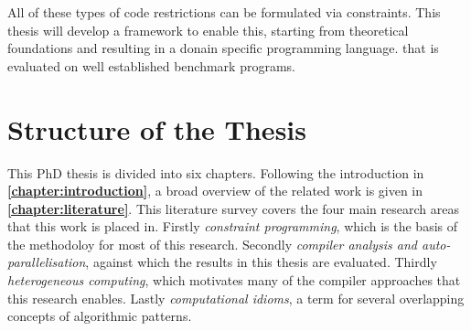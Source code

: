     All of these types of code restrictions can be formulated via constraints.
    This thesis will develop a framework to enable this, starting from
    theoretical foundations and resulting in a donain specific programming
    language. that is evaluated on well established benchmark programs.








\pagebreak
\section{Structure of the Thesis}

    This PhD thesis is divided into six chapters.
    Following the introduction in {\bf\cref{chapter:introduction}}, a broad
    overview of the related work is given in {\bf\cref{chapter:literature}}.
    This literature survey covers the four main research areas that this work
    is placed in.
    Firstly {\em constraint programming}, which is the basis of the methodoloy
    for most of this research.
    Secondly {\em compiler analysis and auto-parallelisation}, against which the
    results in this thesis are evaluated.
    Thirdly {\em heterogeneous computing}, which motivates many of the compiler
    approaches that this research enables.
    Lastly {\em computational idioms}, a term for several overlapping concepts
    of algorithmic patterns.

